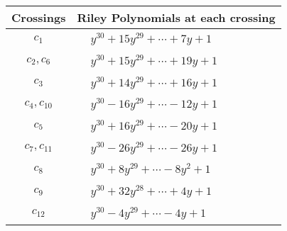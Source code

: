 \documentclass[1p]{elsarticle_modified}
\theoremstyle{definition}
\begin{document}
\begin{tabular}{m{50pt}|m{274pt}}
Crossings & \hspace{64pt}Riley Polynomials at each crossing \\
\hline $$\begin{aligned}c_{1}\end{aligned}$$&$\begin{aligned}
&y^{30}+15 y^{29}+\cdots+7 y+1
\end{aligned}$\\
\hline $$\begin{aligned}c_{2},c_{6}\end{aligned}$$&$\begin{aligned}
&y^{30}+15 y^{29}+\cdots+19 y+1
\end{aligned}$\\
\hline $$\begin{aligned}c_{3}\end{aligned}$$&$\begin{aligned}
&y^{30}+14 y^{29}+\cdots+16 y+1
\end{aligned}$\\
\hline $$\begin{aligned}c_{4},c_{10}\end{aligned}$$&$\begin{aligned}
&y^{30}-16 y^{29}+\cdots-12 y+1
\end{aligned}$\\
\hline $$\begin{aligned}c_{5}\end{aligned}$$&$\begin{aligned}
&y^{30}+16 y^{29}+\cdots-20 y+1
\end{aligned}$\\
\hline $$\begin{aligned}c_{7},c_{11}\end{aligned}$$&$\begin{aligned}
&y^{30}-26 y^{29}+\cdots-26 y+1
\end{aligned}$\\
\hline $$\begin{aligned}c_{8}\end{aligned}$$&$\begin{aligned}
&y^{30}+8 y^{29}+\cdots-8 y^2+1
\end{aligned}$\\
\hline $$\begin{aligned}c_{9}\end{aligned}$$&$\begin{aligned}
&y^{30}+32 y^{28}+\cdots+4 y+1
\end{aligned}$\\
\hline $$\begin{aligned}c_{12}\end{aligned}$$&$\begin{aligned}
&y^{30}-4 y^{29}+\cdots-4 y+1
\end{aligned}$\\
\hline
\end{tabular}\\~\\
\end{document}
